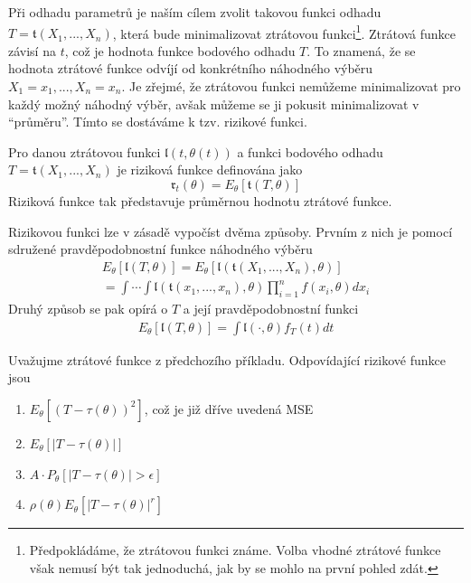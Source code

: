 Při odhadu parametrů je naším cílem zvolit takovou funkci odhadu $T = \mathfrak{t}(X_1, ..., X_n)$, která bude minimalizovat ztrátovou funkci\footnote{Předpokládáme, že ztrátovou funkci známe. Volba vhodné ztrátové funkce však nemusí být tak jednoduchá, jak by se mohlo na první pohled zdát.}. Ztrátová funkce závisí na $t$, což je hodnota funkce bodového odhadu $T$. To znamená, že se hodnota ztrátové funkce odvíjí od konkrétního náhodného výběru $X_1 = x_1, ..., X_n = x_n$. Je zřejmé, že ztrátovou funkci nemůžeme minimalizovat pro každý možný náhodný výběr, avšak můžeme se ji pokusit minimalizovat v ``průměru''. Tímto se dostáváme k tzv. rizikové funkci.

\begin{definition}
Pro danou ztrátovou funkci $\mathfrak{l}(t, \theta(t))$ a funkci bodového odhadu $T = \mathfrak{t}(X_1, ..., X_n)$ je riziková funkce definována jako
\begin{equation*}
\mathfrak{r}_t(\theta) = E_{\theta}[\mathfrak{t}(T, \theta)]
\end{equation*}
Riziková funkce tak představuje průměrnou hodnotu ztrátové funkce.
\end{definition}

Rizikovou funkci lze v zásadě vypočíst dvěma způsoby. Prvním z nich je pomocí sdružené pravděpodobnostní funkce náhodného výběru
\begin{gather*}
E_{\theta}[\mathfrak{l}(T, \theta)] = E_{\theta}[\mathfrak{l}(\mathfrak{t}(X_1, ..., X_n), \theta)]\\
= \int \cdots \int \mathfrak{l}(\mathfrak{t}(x_1, ..., x_n), \theta) \prod_{i = 1}^n f(x_i, \theta) d x_i
\end{gather*}
Druhý způsob se pak opírá o $T$ a její pravděpodobnostní funkci
\begin{gather*}
E_{\theta}[\mathfrak{l}(T, \theta)] = \int \mathfrak{l}(\cdot, \theta)f_T(t)dt
\end{gather*}

\begin{example}
Uvažujme ztrátové funkce z předchozího příkladu. Odpovídající rizikové funkce jsou
\begin{enumerate}
\item $E_{\theta}[(T - \tau(\theta))^2]$, což je již dříve uvedená MSE
\item $E_{\theta}[|T - \tau(\theta)|]$
\item $A \cdot P_{\theta}[|T - \tau(\theta)| > \epsilon]$
\item $\rho(\theta) E_{\theta}[|T - \tau(\theta)|^r]$
\end{enumerate}
\end{example}


